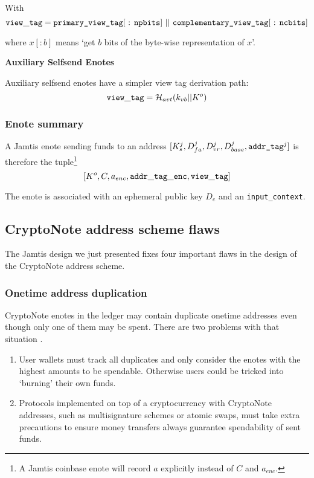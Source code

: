 With
\[ {\tt view\_tag} = \textrm{{\tt primary\_view\_tag}[ : {\tt npbits}] } || \textrm{ {\tt complementary\_view\_tag}[ : {\tt ncbits}]} \]

where $x[:{b}]$ means `get $b$ bits of the byte-wise representation of $x$'.

\textbf{Auxiliary Selfsend Enotes}

Auxiliary selfsend enotes have a simpler view tag derivation path:\vspace{.115cm}
\[ {\tt view\_tag} = \mathcal{H}_{avt}(k_{vb} || K^o) \]

\subsubsection{Enote summary}
\label{subsubsec:jamtis-enote-construction-view-tag}

A Jamtis enote sending funds to an address $[K^j_s, D^j_{fa}, D^j_{vr}, D^j_{base}, \textrm{\tt addr\_tag}^j]$ is therefore the tuple\footnote{A Jamtis coinbase enote will record $a$ explicitly instead of $C$ and $a_{enc}$.}\vspace{.115cm}
\[ [K^o, C, a_{enc}, {\tt addr\_tag\_enc}, {\tt view\_tag}] \]

The enote is associated with an ephemeral public key $D_e$ and an {\tt input\_context}.


\subsection{CryptoNote address scheme flaws}
\label{subsec:jamtis-cryptonote-address-scheme-flaws}

The Jamtis design we just presented fixes four important flaws in the design of the CryptoNote address scheme.

\subsubsection{Onetime address duplication}
\label{subsubsec:jamtis-cryptonote-flaws-duplication}

CryptoNote enotes in the ledger may contain duplicate onetime addresses even though only one of them may be spent. There are two problems with that situation \cite{burning-bug-mrl-103}.
\begin{enumerate}
    \item User wallets must track all duplicates and only consider the enotes with the highest amounts to be spendable. Otherwise users could be tricked into `burning' their own funds.
    \item Protocols implemented on top of a cryptocurrency with CryptoNote addresses, such as multisignature schemes or atomic swaps, must take extra precautions to ensure money transfers always guarantee spendability of sent funds.
\end{enumerate}

